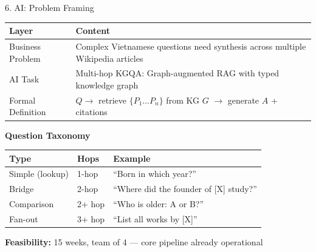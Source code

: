 \documentclass[aspectratio=169]{beamer}
\newcommand{\pos}[1]{\textcolor{positive}{#1}}
\begin{document}
\begin{frame}[shrink=8]{6. AI: Problem Framing}
\begin{center}
\footnotesize
\begin{tabular}{l>{\raggedright\arraybackslash}p{5.5cm}}
\toprule
\textbf{Layer} & \textbf{Content} \\
\midrule
Business Problem & Complex Vietnamese questions need synthesis across multiple Wikipedia articles \\[1pt]
AI Task & Multi-hop KGQA: Graph-augmented RAG with typed knowledge graph \\[1pt]
Formal Definition & $Q \rightarrow$ retrieve $\{P_1 \ldots P_n\}$ from KG $G$ $\rightarrow$ generate $A$ + citations \\
\bottomrule
\end{tabular}
\end{center}
\vspace{0.1em}
\textbf{Question Taxonomy}
\vspace{1pt}
\begin{center}
\footnotesize
\begin{tabular}{lll}
\toprule
\textbf{Type} & \textbf{Hops} & \textbf{Example} \\
\midrule
Simple (lookup) & 1-hop & ``Born in which year?'' \\
Bridge & 2-hop & ``Where did the founder of [X] study?'' \\
Comparison & 2+ hop & ``Who is older: A or B?'' \\
Fan-out & 3+ hop & ``List all works by [X]'' \\
\bottomrule
\end{tabular}
\end{center}
\vspace{0.4em}
\small \pos{\textbf{Feasibility:}} 15 weeks, team of 4 --- core pipeline already operational \checkmark
\end{frame}
\end{document}
